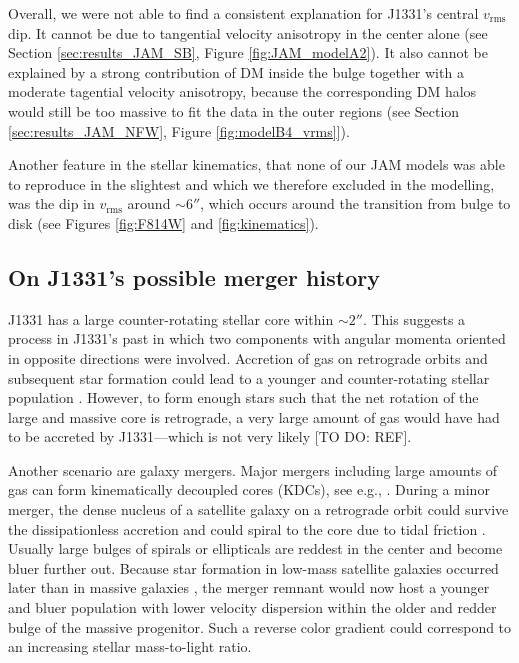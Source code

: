Overall, we were not able to find a consistent explanation for J1331's central $v_\text{rms}$ dip. It cannot be due to tangential velocity anisotropy in the center alone (see Section \ref{sec:results_JAM_SB}, Figure \ref{fig:JAM_modelA2}). It also cannot be explained by a strong contribution of DM inside the bulge together with a moderate tagential velocity anisotropy, because the corresponding DM halos would still be too massive to fit the data in the outer regions (see Section \ref{sec:results_JAM_NFW}, Figure \ref{fig:modelB4_vrms}]).

Another feature in the stellar kinematics, that none of our JAM models was able to reproduce in the slightest and which we therefore excluded in the modelling, was the dip in $v_\text{rms}$ around $\sim 6''$, which occurs around the transition from bulge to disk (see Figures \ref{fig:F814W} and \ref{fig:kinematics}).

\subsection{On J1331's possible merger history}


J1331 has a large counter-rotating stellar core within $\sim 2''$. This suggests a process in J1331's past in which two components with angular momenta oriented in opposite directions were involved. Accretion of gas on retrograde orbits and subsequent star formation could lead to a younger and counter-rotating stellar population \Wilma{[TO DO: REF]}. However, to form enough stars such that the net rotation of the large and massive core is retrograde, a very large amount of gas would have had to be accreted by J1331---which is not very likely [TO DO: REF]. 

Another scenario are galaxy mergers. Major mergers including large amounts of gas can form kinematically decoupled cores (KDCs), see e.g., . During a minor merger, the dense nucleus of a satellite galaxy on a retrograde orbit could survive the dissipationless accretion and could spiral to the core due to tidal friction \citep{1984ApJ...287..577K}. Usually large bulges of spirals or ellipticals are reddest in the center and become bluer further out.  Because star formation in low-mass satellite galaxies occurred later than in massive galaxies \Wilma{[TO DO: REF]}, the merger remnant would now host a younger and bluer population with lower velocity dispersion within the older and redder bulge of the massive progenitor. Such a reverse color gradient could correspond to an increasing stellar mass-to-light ratio.

